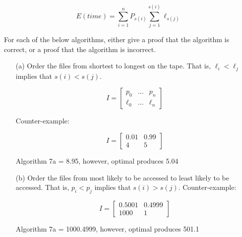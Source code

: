 \documentclass[10pt]{article}
\begin{document}
	\[E(time) = \sum\limits_{i=1}^n P_{s(i)} \sum\limits_{j=1}^{s(i)} \ell_{s(j)}\]
	
	For each of the below algorithms, either give a proof that the algorithm is correct, or a proof that the
	algorithm is incorrect.
	\begin{enumerate}
		\item[(a)] Order the files from shortest to longest on the tape. That is, $\ell_{i} < \ell_{j}$ implies that $s(i) < s(j)$.
		
	\[ I = \left[
		\begin{array}{ccc}
		p_{0} & \ldots & p_{n}\\ 
		\ell_{0} & \ldots & \ell_{n}
		\end{array}
	 \right]\]
	 
	 Counter-example: 
	 
	\[ I = \left[
		\begin{array}{cc}
		0.01 &  0.99\\ 
		4 & 5 
		\end{array}
	 \right]\]
	 
	 Algorithm 7a = 8.95, however, optimal produces 5.04
	 
		\item[(b)] Order the files from most likely to be accessed to least likely to be accessed.  That is, $p_{i} < p_{j}$
		implies that $s(i) > s(j)$.
	 Counter-example: 
	 
	\[ I = \left[
		\begin{array}{cc}
		0.5001 &  0.4999\\ 
		1000 & 1 
		\end{array}
	 \right]\]
	 	
	 	Algorithm 7a = 1000.4999, however, optimal produces 501.1
	 		

\end{enumerate}
\end{document}
